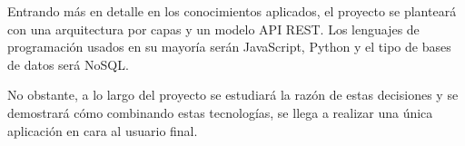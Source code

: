 \vspace{0.3cm}

Entrando más en detalle en los conocimientos aplicados, el proyecto se planteará con una arquitectura por capas y un modelo API REST. Los lenguajes de programación usados en su mayoría serán JavaScript, Python y el tipo de bases de datos será NoSQL. 

\vspace{0.3cm}

No obstante, a lo largo del proyecto se estudiará la razón de estas decisiones y se demostrará cómo combinando estas tecnologías, se llega a realizar una única aplicación en cara al usuario final.

\vfill
